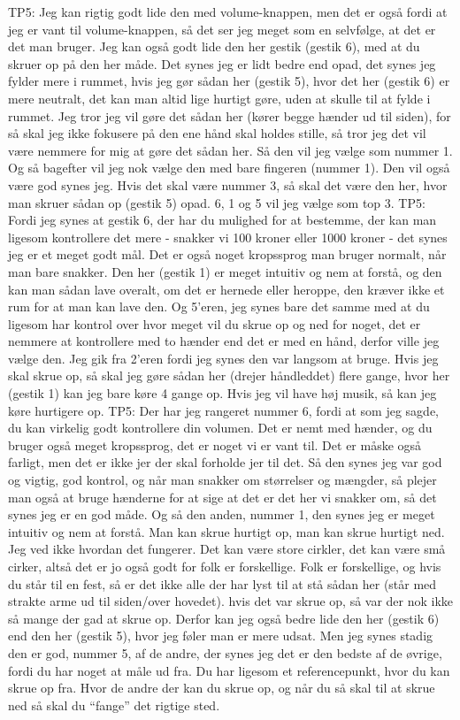 TP5: Jeg kan rigtig godt lide den med volume-knappen, men det er også fordi at jeg er vant til volume-knappen, så det ser jeg meget som en selvfølge, at det er det man bruger. Jeg kan også godt lide den her gestik (gestik 6), med at du skruer op på den her måde. Det synes jeg er lidt bedre end opad, det synes jeg fylder mere i rummet, hvis jeg gør sådan her (gestik 5), hvor det her (gestik 6) er mere neutralt, det kan man altid lige hurtigt gøre, uden at skulle til at fylde i rummet. Jeg tror jeg vil gøre det sådan her (kører begge hænder ud til siden), for så skal jeg ikke fokusere på den ene hånd skal holdes stille, så tror jeg det vil være nemmere for mig at gøre det sådan her. Så den vil jeg vælge som nummer 1. Og så bagefter vil jeg nok vælge den med bare fingeren (nummer 1). Den vil også være god synes jeg. Hvis det skal være nummer 3, så skal det være den her, hvor man skruer sådan op (gestik 5) opad. 6, 1 og 5 vil jeg vælge som top 3.
TP5: Fordi jeg synes at gestik 6, der har du mulighed for at bestemme, der kan man ligesom kontrollere det mere - snakker vi 100 kroner eller 1000 kroner - det synes jeg er et meget godt mål. Det er også noget kropssprog man bruger normalt, når man bare snakker. Den her (gestik 1) er meget intuitiv og nem at forstå, og den kan man sådan lave overalt, om det er hernede eller heroppe, den kræver ikke et rum for at man kan lave den. Og 5’eren, jeg synes bare det samme med at du ligesom har kontrol over hvor meget vil du skrue op og ned for noget, det er nemmere at kontrollere med to hænder end det er med en hånd, derfor ville jeg vælge den. Jeg gik fra 2’eren fordi jeg synes den var langsom at bruge. Hvis jeg skal skrue op, så skal jeg gøre sådan her (drejer håndleddet) flere gange, hvor her (gestik 1) kan jeg bare køre 4 gange op. Hvis jeg vil have høj musik, så kan jeg køre hurtigere op. 
TP5: Der har jeg rangeret nummer 6, fordi at som jeg sagde, du kan virkelig godt kontrollere din volumen. Det er nemt med hænder, og du bruger også meget kropssprog, det er noget vi er vant til. Det er måske også farligt, men det er ikke jer der skal forholde jer til det. Så den synes jeg var god og vigtig, god kontrol, og når man snakker om størrelser og mængder, så plejer man også at bruge hænderne for at sige at det er det her vi snakker om, så det synes jeg er en god måde. Og så den anden, nummer 1, den synes jeg er meget intuitiv og nem at forstå. Man kan skrue hurtigt op, man kan skrue hurtigt ned. Jeg ved ikke hvordan det fungerer. Det kan være store cirkler, det kan være små cirker, altså det er jo også godt for folk er forskellige. Folk er forskellige, og hvis du står til en fest, så er det ikke alle der har lyst til at stå sådan her (står med strakte arme ud til siden/over hovedet). hvis det var skrue op, så var der nok ikke så mange der gad at skrue op. Derfor kan jeg også bedre lide den her (gestik 6) end den her (gestik 5), hvor jeg føler man er mere udsat. Men jeg synes stadig den er god, nummer 5, af de andre, der synes jeg det er den bedste af de øvrige, fordi du har noget at måle ud fra. Du har ligesom et referencepunkt, hvor du kan skrue op fra. Hvor de andre der kan du skrue op, og når du så skal til at skrue ned så skal du “fange” det rigtige sted.

